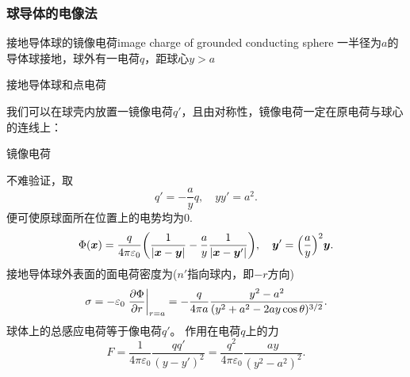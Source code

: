 \subsubsection{球导体的电像法}
\begin{example}{接地导体球的镜像电荷}{image charge of grounded conducting sphere}
    一半径为$a$的导体球接地，球外有一电荷$q$，距球心$y>a$
    \begin{center}\usetikzlibrary{circuits.ee.IEC}
        \tikzchap 接地导体球和点电荷
    \end{center}
    我们可以在球壳内放置一镜像电荷$q'$，且由对称性，镜像电荷一定在原电荷与球心的连线上：
    \begin{center}
        \tikzchap 镜像电荷
    \end{center}
    不难验证，取
    \begin{equation}
        \label{eqn:image of point, grounded conducting sphere}
        q'=-\frac ayq,\quad yy'=a^2.
    \end{equation}
    便可使原球面所在位置上的电势均为0.
    \begin{equation}
        \Phi(\bm x)=\frac q{4\pi\varepsilon_0}\biggl(\frac1{|\bm x-\bm y|}-\frac ay\frac1{|\bm x-\bm y'|}\biggr),\quad\bm y'=\Bigl(\frac ay\Bigr)^2\bm y.
    \end{equation}
    \tcblower
    接地导体球外表面的面电荷密度为($n'$指向球内，即$-r$方向)
    \begin{equation}
        \label{eqn:surface charge density of grounded conducting sphere, point}
        \sigma=-\varepsilon_0\left.\frac{\partial^{\;\!\!}\Phi}{\partial r^{\;\!\!}}\right\rvert_{r=a}=-\frac q{4\pi a}\frac{y^2-a^2}{(y^2+a^2-2ay\cos\theta)^{3/2}}.
    \end{equation}
    球体上的总感应电荷等于像电荷$q'$。%
    作用在电荷$q$上的力%
    \begin{equation}
        \label{eqn:force between point, grounded conducting sphere}
        F=\frac1{4\pi\varepsilon_0}\frac{qq'}{(y-y')^2}=\frac{q^2}{4\pi\varepsilon_0}\frac{ay}{(y^2-a^2)^2}.
    \end{equation}
\end{example}
